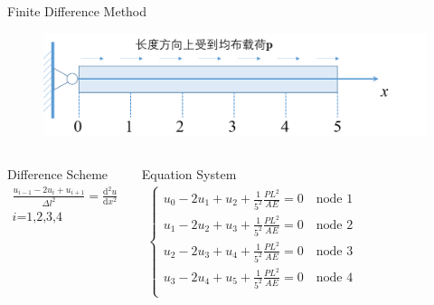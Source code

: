 \documentclass[11pt]{beamer}
\begin{document}
\begin{frame}{Finite Difference Method}	
\begin{figure}
\centering
\includegraphics[width=0.7\linewidth]{source/differential_1}
\end{figure}

\begin{columns}
\begin{block}{Difference Scheme}
\begin{align*}
\frac{u_{i-1}-2u_{i}+u_{i+1}}{\Delta l^2}=\frac{\mathrm{d}^2u}{\mathrm{d}x^2}\\
\text{$i$=1,2,3,4}
\end{align*}
\end{block}
\begin{block}{Equation System}
\begin{align*}
\begin{cases}
u_0-2u_1+u_2+\frac{1}{5^2}\frac{PL^2}{AE}=0\quad\text{node 1}\\
u_1-2u_2+u_3+\frac{1}{5^2}\frac{PL^2}{AE}=0\quad\text{node 2}\\
u_2-2u_3+u_4+\frac{1}{5^2}\frac{PL^2}{AE}=0\quad\text{node 3}\\
u_3-2u_4+u_5+\frac{1}{5^2}\frac{PL^2}{AE}=0\quad\text{node 4}\\
\end{cases}
\end{align*}
\end{block}
\end{columns}
\end{frame}
\end{document}
